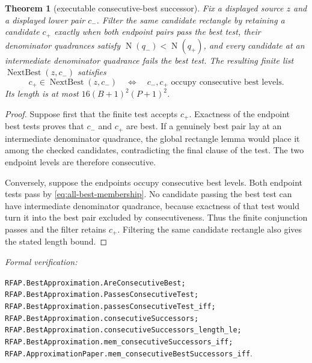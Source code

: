 \documentclass[11pt]{article}
\newtheorem{theorem}{Theorem}[section]
\newcommand{\Norm}[1]{\operatorname{N}\!\left(#1\right)}
\newcommand{\leanref}[1]{\par\smallskip\noindent
  \emph{Formal verification:}\par\nobreak
  {\raggedright\nolinkurl{#1}.\par}}
\begin{document}
\begin{theorem}[executable consecutive-best successor]
\label{thm:consecutive-best-selector}
Fix a displayed source $z$ and a displayed lower pair $c_-$.  Filter the same
candidate rectangle by retaining a candidate $c_+$ exactly when both endpoint
pairs pass the best test, their denominator quadrances satisfy
$\Norm{q_-}<\Norm{q_+}$, and every candidate at an intermediate denominator
quadrance fails the best test.  The resulting finite list
$\operatorname{NextBest}(z,c_-)$ satisfies
\begin{equation}
\label{eq:next-best-selector-membership}
 c_+\in\operatorname{NextBest}(z,c_-)
 \quad\Longleftrightarrow\quad
 c_-,c_+\text{ occupy consecutive best levels}.
\end{equation}
Its length is at most $16(B+1)^2(P+1)^2$.
\end{theorem}

\begin{proof}
Suppose first that the finite test accepts $c_+$.  Exactness of the endpoint
best tests proves that $c_-$ and $c_+$ are best.  If a genuinely best pair
lay at an intermediate denominator quadrance, the global rectangle lemma
would place it among the checked candidates, contradicting the final clause
of the test.  The two endpoint levels are therefore consecutive.

Conversely, suppose the endpoints occupy consecutive best levels.  Both
endpoint tests pass by \eqref{eq:all-best-membership}.  No candidate passing
the best test can have intermediate denominator quadrance, because exactness
of that test would turn it into the best pair excluded by consecutiveness.
Thus the finite conjunction passes and the filter retains $c_+$.  Filtering
the same candidate rectangle also gives the stated length bound.
\end{proof}

\leanref{RFAP.BestApproximation.AreConsecutiveBest;
RFAP.BestApproximation.PassesConsecutiveTest;
RFAP.BestApproximation.passesConsecutiveTest_iff;
RFAP.BestApproximation.consecutiveSuccessors;
RFAP.BestApproximation.consecutiveSuccessors_length_le;
RFAP.BestApproximation.mem_consecutiveSuccessors_iff;
RFAP.ApproximationPaper.mem_consecutiveBestSuccessors_iff}
\end{document}
